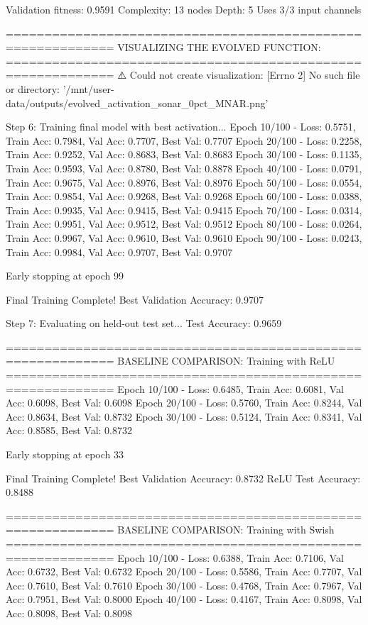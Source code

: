 Validation fitness: 0.9591
Complexity: 13 nodes
Depth: 5
Uses 3/3 input channels

============================================================
VISUALIZING THE EVOLVED FUNCTION:
============================================================
⚠️ Could not create visualization: [Errno 2] No such file or directory: '/mnt/user-data/outputs/evolved_activation_sonar_0pct_MNAR.png'

Step 6: Training final model with best activation...
Epoch  10/100 - Loss: 0.5751, Train Acc: 0.7984, Val Acc: 0.7707, Best Val: 0.7707
Epoch  20/100 - Loss: 0.2258, Train Acc: 0.9252, Val Acc: 0.8683, Best Val: 0.8683
Epoch  30/100 - Loss: 0.1135, Train Acc: 0.9593, Val Acc: 0.8780, Best Val: 0.8878
Epoch  40/100 - Loss: 0.0791, Train Acc: 0.9675, Val Acc: 0.8976, Best Val: 0.8976
Epoch  50/100 - Loss: 0.0554, Train Acc: 0.9854, Val Acc: 0.9268, Best Val: 0.9268
Epoch  60/100 - Loss: 0.0388, Train Acc: 0.9935, Val Acc: 0.9415, Best Val: 0.9415
Epoch  70/100 - Loss: 0.0314, Train Acc: 0.9951, Val Acc: 0.9512, Best Val: 0.9512
Epoch  80/100 - Loss: 0.0264, Train Acc: 0.9967, Val Acc: 0.9610, Best Val: 0.9610
Epoch  90/100 - Loss: 0.0243, Train Acc: 0.9984, Val Acc: 0.9707, Best Val: 0.9707

Early stopping at epoch 99

Final Training Complete!
Best Validation Accuracy: 0.9707

Step 7: Evaluating on held-out test set...
Test Accuracy: 0.9659

============================================================
BASELINE COMPARISON: Training with ReLU
============================================================
Epoch  10/100 - Loss: 0.6485, Train Acc: 0.6081, Val Acc: 0.6098, Best Val: 0.6098
Epoch  20/100 - Loss: 0.5760, Train Acc: 0.8244, Val Acc: 0.8634, Best Val: 0.8732
Epoch  30/100 - Loss: 0.5124, Train Acc: 0.8341, Val Acc: 0.8585, Best Val: 0.8732

Early stopping at epoch 33

Final Training Complete!
Best Validation Accuracy: 0.8732
ReLU Test Accuracy: 0.8488

============================================================
BASELINE COMPARISON: Training with Swish
============================================================
Epoch  10/100 - Loss: 0.6388, Train Acc: 0.7106, Val Acc: 0.6732, Best Val: 0.6732
Epoch  20/100 - Loss: 0.5586, Train Acc: 0.7707, Val Acc: 0.7610, Best Val: 0.7610
Epoch  30/100 - Loss: 0.4768, Train Acc: 0.7967, Val Acc: 0.7951, Best Val: 0.8000
Epoch  40/100 - Loss: 0.4167, Train Acc: 0.8098, Val Acc: 0.8098, Best Val: 0.8098


